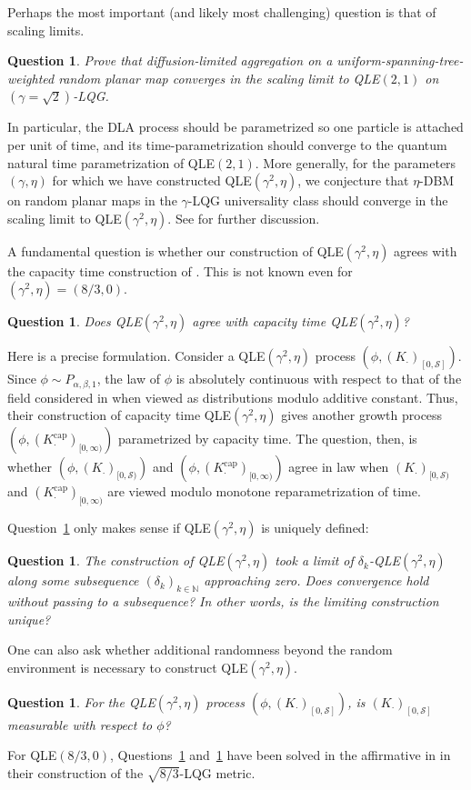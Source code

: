 \documentclass[a4paper]{article}
\numberwithin{equation}{section}
\newcommand{\N}{\mathbb{N}}
\newcommand{\qduration}{\mathcal{S}}
\newtheorem{question}[theorem]{Question}
\theoremstyle{remark}
\numberwithin{equation}{section}
\begin{document}
Perhaps the most important (and likely most challenging) question is that of scaling limits. 

\begin{question}\label{question-scaling}
    Prove that diffusion-limited aggregation on a uniform-spanning-tree-weighted random planar map converges in the scaling limit to QLE$(2, 1)$ on $(\gamma = \sqrt2)$-LQG. 
\end{question}
In particular, the DLA process should be parametrized so one particle is attached per unit of time, and its time-parametrization should converge to the quantum natural time parametrization of QLE$(2,1)$. 
More generally, for the parameters $(\gamma, \eta)$ for which we have constructed QLE$(\gamma^2, \eta)$, we conjecture that  $\eta$-DBM on random planar maps in the $\gamma$-LQG universality class should converge in the scaling limit to QLE$(\gamma^2, \eta)$. See \cite{ms-qle} for further discussion.

A fundamental question is whether our construction of QLE$(\gamma^2, \eta)$ agrees with the capacity time construction of \cite{ms-qle}. This is not known even for $(\gamma^2, \eta) = (8/3,0)$.
\begin{question}\label{question-equiv}
Does QLE$(\gamma^2, \eta)$ agree with capacity time QLE$(\gamma^2, \eta)$?
\end{question}
Here is a precise formulation. Consider a QLE$(\gamma^2, \eta)$ process $(\phi, (K_\cdot)_{[0,\qduration]})$. Since $\phi \sim P_{\alpha, \beta, 1}$, the law of $\phi$ is absolutely continuous with respect to that of the field considered in \cite{ms-equivalence} when viewed as distributions modulo additive constant. Thus, their construction of capacity time QLE$(\gamma^2, \eta)$ gives another growth process $(\phi, (K^\mathrm{cap}_\cdot)_{[0,\infty)})$ parametrized by capacity time. The question, then, is whether $(\phi, (K_\cdot)_{[0,\qduration)})$ and $(\phi, (K^\mathrm{cap}_\cdot)_{[0,\infty)})$ agree in law when $(K_\cdot)_{[0,\qduration)}$ and $(K^\mathrm{cap}_\cdot)_{[0,\infty)}$ are viewed modulo monotone reparametrization of time. 

Question~\ref{question-equiv} only makes sense if QLE$(\gamma^2, \eta)$ is uniquely defined:

\begin{question}\label{question-unique}
    The construction of QLE$(\gamma^2, \eta)$ took a limit of $\delta_k$-QLE$(\gamma^2, \eta)$ along some subsequence $(\delta_k)_{k \in \N}$ approaching zero. Does convergence hold without passing to a subsequence? In other words, is the limiting construction unique? 
\end{question}
One can also ask whether additional randomness beyond the random environment is necessary to construct QLE$(\gamma^2, \eta)$. 
\begin{question}\label{question-measurability}
    For the QLE$(\gamma^2, \eta)$ process $(\phi, (K_\cdot)_{[0,\qduration]})$, is $(K_\cdot)_{[0,\qduration]}$ measurable with respect to $\phi$?
\end{question}
For QLE$(8/3, 0)$, Questions~\ref{question-unique} and~\ref{question-measurability} have been solved in the affirmative in \cite{ms-equivalence} in their construction of the $\sqrt{8/3}$-LQG metric. 
\end{document}
